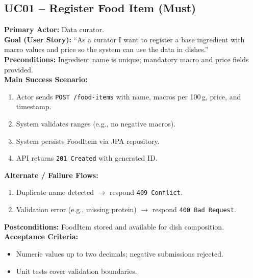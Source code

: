 \documentclass[11pt]{article}
\begin{document}
\subsection*{UC01 -- Register Food Item (Must)}
\textbf{Primary Actor:} Data curator.\\
\textbf{Goal (User Story):} ``As a curator I want to register a base ingredient with macro values and price so the system can use the data in dishes.''\\
\textbf{Preconditions:} Ingredient name is unique; mandatory macro and price fields provided.\\
\textbf{Main Success Scenario:}
\begin{enumerate}[label=\arabic*.]
  \item Actor sends \texttt{POST /food-items} with name, macros per 100\,g, price, and timestamp.
  \item System validates ranges (e.g., no negative macros).
  \item System persists FoodItem via JPA repository.
  \item API returns \texttt{201 Created} with generated ID.
\end{enumerate}
\textbf{Alternate / Failure Flows:}
\begin{enumerate}[label=\arabic*F.]
  \item Duplicate name detected $\rightarrow$ respond \texttt{409 Conflict}.
  \item Validation error (e.g., missing protein) $\rightarrow$ respond \texttt{400 Bad Request}.
\end{enumerate}
\textbf{Postconditions:} FoodItem stored and available for dish composition.\\
\textbf{Acceptance Criteria:}
\begin{itemize}[noitemsep]
  \item Numeric values up to two decimals; negative submissions rejected.
  \item Unit tests cover validation boundaries.
\end{itemize}
\end{document}
